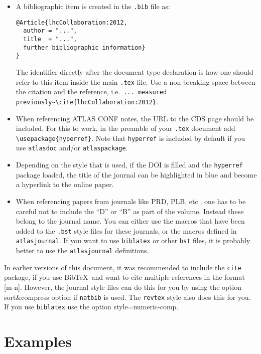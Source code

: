 \documentclass[UKenglish]{latex/atlasdoc}
\newcommand*{\BibTeX}{Bib\TeX}
\newcommand{\File}[1]{\texttt{#1}\xspace}
\newcommand{\Option}[1]{\textsf{#1}\xspace}
\newcommand{\Package}[1]{\texttt{#1}\xspace}
\begin{document}
\begin{itemize}
\item A bibliographic item is created in the \File{.bib} file as:
\begin{verbatim}
@Article{lhcCollaboration:2012,
  author = "...",
  title  = "...",
  further bibliographic information}
}
\end{verbatim}
  The identifier directly after the document type declaration is how one should refer to this item inside the main \File{.tex} file.
  Use a non-breaking space between the citation and the reference, i.e.\
  \verb|... measured previously~\cite{lhcCollaboration:2012}|.
\item When referencing ATLAS CONF notes, the URL to the CDS page should be included.
  For this to work, in the preamble of your \File{.tex} document add
  \texttt{\textbackslash usepackage\{hyperref\}}.
  Note that \Package{hyperref} is included by default if you use \Package{atlasdoc} and/or \Package{atlaspackage}.
\item Depending on the style that is used,
  if the DOI is filled and the \texttt{hyperref} package loaded, 
  the title of the journal can be highlighted in blue and become a hyperlink to the online paper.
\item When referencing papers from journals like PRD, PLB, etc.,
  one has to be careful not to include the \enquote{D} or \enquote{B} as part of the volume.
  Instead these belong to the journal name. 
  You can either use the macros that have been added to the \File{.bst} style files for these journals, or
  the macros defined in \Package{atlasjournal}.
  If you want to use \Package{biblatex} or other \File{bst} files, it is probably better to use the
  \Package{atlasjournal} definitions.
\end{itemize}

In earlier versions of this document, it was recommended to include the \Package{cite} package, 
if you use \BibTeX\ and want to cite multiple references in the format [m-n].
However, the journal style files can do this for you by using the option \Option{sort\&compress} option if \Package{natbib} is used.
The \texttt{revtex} style also does this for you.
If you use \texttt{biblatex} use the option \Option{style=numeric-comp}.

\section{Examples}
\end{document}
